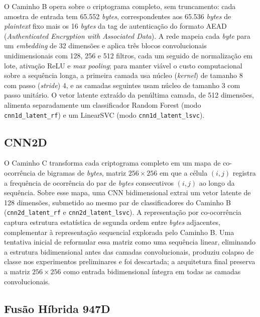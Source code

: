 O Caminho B opera sobre o criptograma completo, sem truncamento: cada amostra de entrada tem 65.552 \emph{bytes}, correspondentes aos 65.536 \emph{bytes} de \emph{plaintext} fixo mais os 16 \emph{bytes} da tag de autenticação do formato AEAD (\emph{Authenticated Encryption with Associated Data}). A rede mapeia cada \emph{byte} para um \emph{embedding} de 32 dimensões e aplica três blocos convolucionais unidimensionais com 128, 256 e 512 filtros, cada um seguido de normalização em lote, ativação ReLU e \emph{max pooling}; para manter viável o custo computacional sobre a sequência longa, a primeira camada usa núcleo (\emph{kernel}) de tamanho 8 com passo (\emph{stride}) 4, e as camadas seguintes usam núcleo de tamanho 3 com passo unitário. O vetor latente extraído da penúltima camada, de 512 dimensões, alimenta separadamente um classificador Random Forest (modo \texttt{cnn1d\_latent\_rf}) e um LinearSVC (modo \texttt{cnn1d\_latent\_lsvc}).

\subsection{CNN2D}
\label{sec:cnn2d-caminho-c}

O Caminho C transforma cada criptograma completo em um mapa de co-ocorrência de bigramas de \emph{bytes}, matriz $256 \times 256$ em que a célula $(i,j)$ registra a frequência de ocorrência do par de \emph{bytes} consecutivos $(i,j)$ ao longo da sequência. Sobre esse mapa, uma CNN bidimensional extrai um vetor latente de 128 dimensões, submetido ao mesmo par de classificadores do Caminho B (\texttt{cnn2d\_latent\_rf} e \texttt{cnn2d\_latent\_lsvc}). A representação por co-ocorrência captura estrutura estatística de segunda ordem entre \emph{bytes} adjacentes, complementar à representação sequencial explorada pelo Caminho B. Uma tentativa inicial de reformular essa matriz como uma sequência linear, eliminando a estrutura bidimensional antes das camadas convolucionais, produziu colapso de classe nos experimentos preliminares e foi descartada; a arquitetura final preserva a matriz $256 \times 256$ como entrada bidimensional íntegra em todas as camadas convolucionais.

\subsection{Fusão Híbrida 947D}
\label{sec:fusao-hibrida-caminho-d}

